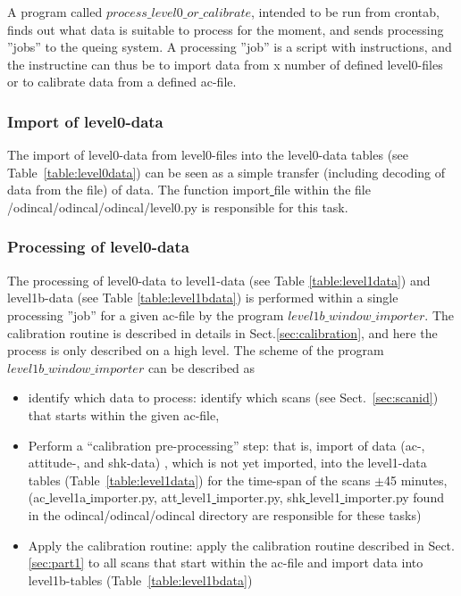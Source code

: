 \documentclass[12pt]{article}
\begin{document}
A program called \(process\_level0\_or\_calibrate\), intended to be run
from crontab, finds out what data is suitable to process for the moment,
and sends processing ''jobs'' to the queing system.
A processing ''job'' is a script with instructions, 
and the instructine can thus be to import data from
x number of defined level0-files or to calibrate data from a defined 
ac-file.




\subsubsection{Import of level0-data}
\label{sec:level0import}
The import of level0-data from level0-files
into the level0-data tables (see Table~\ref{table:level0data})
can be seen as a simple transfer (including decoding of data from the file) 
of data. The function import\underline{ }file within the file\\ 
/odincal/odincal/odincal/level0.py is responsible for this task.  
 

\subsubsection{Processing of level0-data}
\label{sec:level0processing}
The processing of level0-data to level1-data (see Table \ref{table:level1data}) 
and level1b-data (see Table \ref{table:level1bdata}) is performed
within a single processing ''job'' for a given ac-file 
by the program \(level1b\_window\_importer\).
The calibration routine is described in details in Sect.\ref{sec:calibration},
and here the process is only described on a high level.
The scheme of the program \(level1b\_window\_importer\) 
can be described as
\begin{itemize}
\item identify which data to process:\newline
identify which scans (see Sect.~\ref{sec:scanid}) that starts 
within the given ac-file,
\item Perform a ``calibration pre-processing'' step:\newline
that is, import of data (ac-, attitude-, and shk-data) , which is not 
yet imported, into the level1-data tables (Table~\ref{table:level1data}) 
for the time-span of the scans \(\pm\)45 minutes,
(ac\underline{ }level1a\underline{ }importer.py,
att\underline{ }level1\underline{ }importer.py,
shk\underline{ }level1\underline{ }importer.py found in the 
odincal/odincal/odincal directory are responsible for these tasks)

\item Apply the calibration routine:\newline
apply the calibration routine described in Sect.\ref{sec:part1}
to all scans that start within the ac-file and import data into level1b-tables
(Table~\ref{table:level1bdata})

\end{itemize}
 
\end{document}
